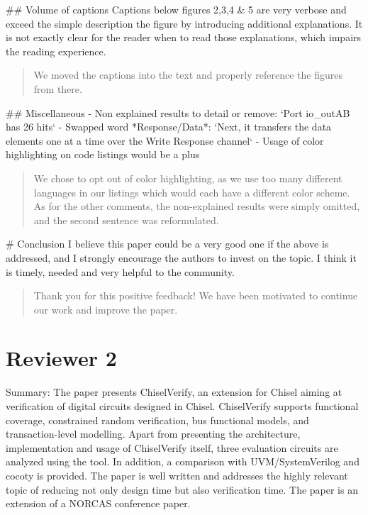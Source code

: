 \documentclass{article}
\newcommand{\todo}[1]{{\color{olive} TODO: #1}}
\newcommand{\reply}[1]{{\color{blue} #1}}
\begin{document}
\#\# Volume of captions
Captions below figures 2,3,4 \& 5 are very verbose and exceed the simple description the figure by introducing additional explanations.
It is not exactly clear for the reader when to read those explanations, which impairs the reading experience.  

\begin{quote}
\reply{
We moved the captions into the text and properly reference the figures from there.
}
\end{quote}

\#\# Miscellaneous
- Non explained results to detail or remove: `Port io\_outAB has 26 hits`
- Swapped word *Response/Data*: `Next, it transfers the data elements one at a time over the Write Response channel`
- Usage of color highlighting on code listings would be a plus


\begin{quote}
\reply{
We chose to opt out of color highlighting, as we use too many different languages in our listings which would each have a different color scheme.
As for the other comments, the non-explained results were simply omitted, and the second sentence was reformulated.
}
\end{quote}



\# Conclusion
I believe this paper could be a very good one if the above is addressed, and I strongly encourage the authors to invest on the topic. 
I think it is timely, needed and very helpful to the community.

\begin{quote}
\reply{
Thank you for this positive feedback! We have been motivated to continue our work and improve the paper.
}
\end{quote}


\section*{Reviewer 2}

Summary:
The paper presents ChiselVerify, an extension for Chisel aiming at verification of digital circuits designed in Chisel. ChiselVerify supports functional coverage, constrained random verification, bus functional models, and transaction-level modelling. Apart from presenting the architecture, implementation and usage of ChiselVerify itself, three evaluation circuits are analyzed using the tool. In addition, a comparison with UVM/SystemVerilog and cocoty is provided. The paper is well written and addresses the highly relevant topic of reducing not only design time but also verification time. The paper is an extension of a NORCAS conference paper.
\end{document}
